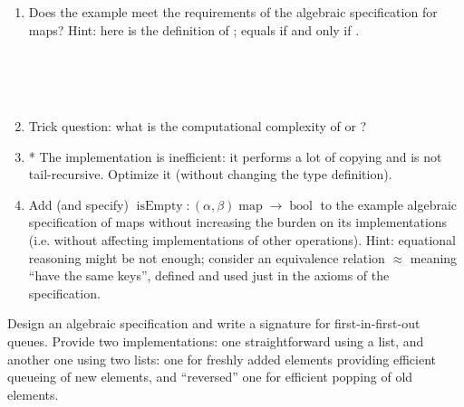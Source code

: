 \documentclass{article}
\newcommand{\tmdummy}{$\mbox{}$}
\newcommand{\tmop}[1]{\ensuremath{\operatorname{#1}}}
\newcommand{\tmverbatim}[1]{\text{{\ttfamily{#1}}}}
{\theorembodyfont{\rmfamily\small}\newtheorem{exercise}{Exercise}}
\begin{document}
\begin{exercise}
  {\tmdummy}
  
  \begin{enumerate}
    \item Does the example {} meet the requirements of the
    algebraic specification for maps? Hint: here is the definition of
    {}{}{};
    \tmverbatim{compare a x} equals {} if and only if
    \tmverbatim{a}{\hlopt{ = }}\tmverbatim{x}.
    
    {\small{{}{}{\hlopt{= }}{}{\hlendline{}}\\
    {\hlstd{ \ }}{\hlopt{\textbar  [] -> []}}{\hlendline{}}\\
    {\hlstd{ \ }}{\hlopt{\textbar  (}}{}{\hlopt{, }}{}{}{}{\hlopt{) :: }}{}{\hlopt{->}}{\hlendline{}}\\
    {\hlstd{ \ \ \ \ \ }}{}{}{\hlopt{=
    }}{}{}{}{}{}{\hlopt{:: }}{}{\hlendline{}}}}
    
    \item Trick question: what is the computational complexity of
    {} or {}?
    
    \item * The implementation {} is inefficient: it performs
    a lot of copying and is not tail-recursive. Optimize it (without changing
    the type definition).
    
    \item Add (and specify) $\tmop{isEmpty} : (\alpha, \beta) \tmop{map}
    \rightarrow \tmop{bool}$ to the example algebraic specification of maps
    without increasing the burden on its implementations (i.e. without
    affecting implementations of other operations). Hint: equational reasoning
    might be not enough; consider an equivalence relation $\approx$ meaning
    ``have the same keys'', defined and used just in the axioms of the
    specification.
  \end{enumerate}
\end{exercise}

\begin{exercise}
  Design an algebraic specification and write a signature for
  first-in-first-out queues. Provide two implementations: one straightforward
  using a list, and another one using two lists: one for freshly added
  elements providing efficient queueing of new elements, and ``reversed'' one
  for efficient popping of old elements.
\end{exercise}
\end{document}
